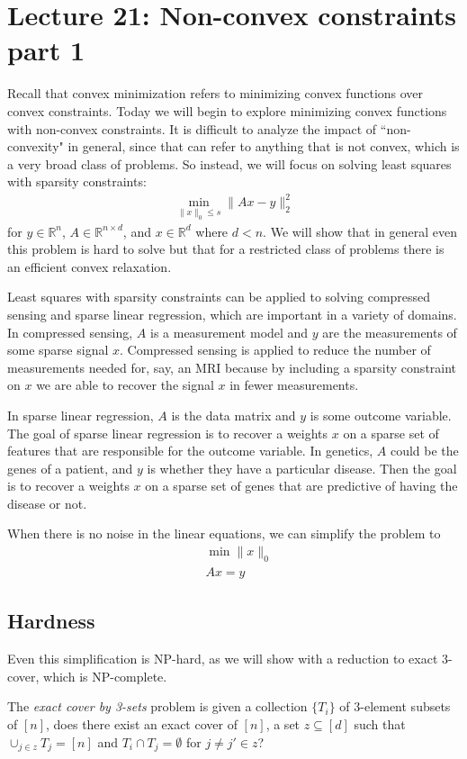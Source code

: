 \documentclass[11pt]{article}
\begin{document}
\section{Lecture 21: Non-convex constraints part 1}
Recall that convex minimization refers to minimizing convex functions over convex constraints. Today we will begin to explore minimizing convex functions with non-convex constraints. It is difficult to analyze the impact of ``non-convexity" in general, since that can refer to anything that is not convex, which is a very broad class of problems. So instead, we will focus on solving least squares with sparsity constraints:
\begin{align*}
    \min_{\|x\|_0 \leq s} \|Ax-y\|^2_2
\end{align*}
for $y \in \mathbb{R}^{n}$, $A \in \mathbb{R}^{n \times d}$, and $x \in \mathbb{R}^{d}$ where $d < n$. We will show that in general even this problem is hard to solve but that for a restricted class of problems there is an efficient convex relaxation.

Least squares with sparsity constraints can be applied to solving compressed sensing and sparse linear regression, which are important in a variety of domains. In compressed sensing, $A$ is a measurement model and $y$ are the measurements of some sparse signal $x$. Compressed sensing is applied to reduce the number of measurements needed for, say, an MRI because by including a sparsity constraint on $x$ we are able to recover the signal $x$ in fewer measurements.

In sparse linear regression, $A$ is the data matrix and $y$ is some outcome variable. The goal of sparse linear regression is to recover a weights $x$ on a sparse set of features that are responsible for the outcome variable. In genetics, $A$ could be the genes of a patient, and $y$ is whether they have a particular disease. Then the goal is to recover a weights $x$ on a sparse set of genes that are predictive of having the disease or not.

When there is no noise in the linear equations, we can simplify the problem to
\begin{align*}
    & \min \|x\|_0 \\
    &  Ax = y
\end{align*}

\subsection{Hardness}
Even this simplification is NP-hard, as we will show with a reduction to exact 3-cover, which is NP-complete.
\begin{definition}
The \textit{exact cover by 3-sets} problem is given a collection $\{T_i\}$ of 3-element subsets of $[n]$, does there exist an exact cover of $[n]$, a set $z \subseteq [d]$ such that $\cup_{j \in z} T_j = [n]$ and $T_i \cap T_j = \emptyset$ for $j \neq j' \in z$?
\end{definition}
\end{document}
